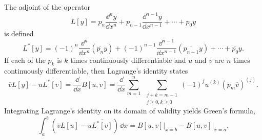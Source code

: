\begin{Result}
  The adjoint of the operator
  \[ 
  L[y] = p_n \frac{\dd^n y}{\dd x^n} + p_{n-1} \frac{\dd^{n-1} y}{\dd x^{n-1}} + \cdots + p_0 y
  \]
  is defined
  \[ 
  L^*[y] = (-1)^n \frac{\dd^n}{\dd x^n} (\overline{p_n} y) + (-1)^{n-1}
  \frac{\dd^{n-1}}{\dd x^{n-1}}(\overline{p_{n-1}} y) + \cdots + \overline{p_0} y. 
  \]
  If each of the $p_k$ is $k$ times continuously differentiable and $u$ and
  $v$ are $n$ times continuously differentiable, then Lagrange's identity states
  \[ 
  \overline{v}L[y] - u \overline{L^*[v]} = \frac{\dd}{\dd x} B[u,v]
  = \frac{\dd}{\dd x} \sum_{m=1}^n \ \sum_{\substack{ j+k=m-1 \\ j\geq 0, 
      k \geq 0 }} (-1)^j u^{(k)} (p_m \overline{v})^{(j)}.
  \]
  Integrating Lagrange's identity on its domain of validity yields
  Green's formula,
  \[ 
  \int_a^b \left( \overline{v} L[u] - u \overline{L^*[v]} \right)\,\dd x =
  B[u,v] \big|_{x=b} - B[u,v] \big|_{x=a}. 
  \]
\end{Result}













